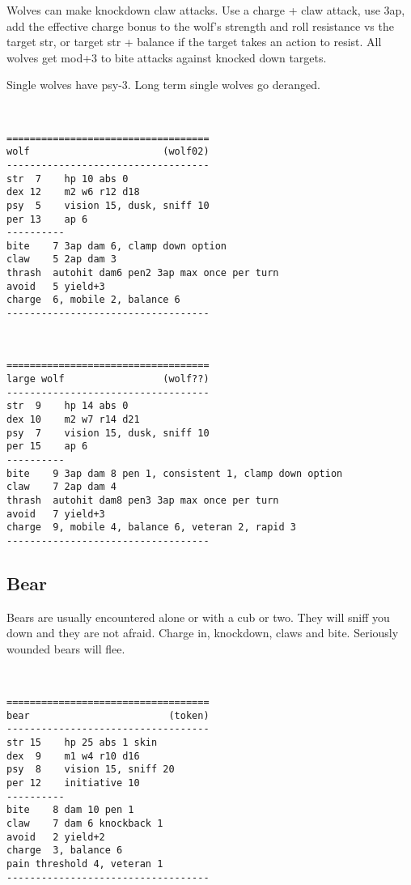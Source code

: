 Wolves can make knockdown claw attacks. Use a charge + claw attack, use 3ap, add the effective charge bonus to the wolf's strength and roll resistance vs the target str, or target str + balance if the target takes an action to resist.
All wolves get mod+3 to bite attacks against knocked down targets.

Single wolves have psy-3. Long term single wolves go deranged.

\

\small \begin{verbatim}
===================================
wolf                       (wolf02)
-----------------------------------
str  7    hp 10 abs 0
dex 12    m2 w6 r12 d18
psy  5    vision 15, dusk, sniff 10
per 13    ap 6
----------
bite    7 3ap dam 6, clamp down option
claw    5 2ap dam 3
thrash  autohit dam6 pen2 3ap max once per turn
avoid   5 yield+3
charge  6, mobile 2, balance 6
-----------------------------------
\end{verbatim} \normalsize

\

\begin{samepage} \small \begin{verbatim}
===================================
large wolf                 (wolf??)
-----------------------------------
str  9    hp 14 abs 0
dex 10    m2 w7 r14 d21
psy  7    vision 15, dusk, sniff 10
per 15    ap 6
----------
bite    9 3ap dam 8 pen 1, consistent 1, clamp down option
claw    7 2ap dam 4
thrash  autohit dam8 pen3 3ap max once per turn
avoid   7 yield+3
charge  9, mobile 4, balance 6, veteran 2, rapid 3
-----------------------------------
\end{verbatim} \normalsize \end{samepage}



\goodbreak \begin{samepage}
\subsection*{Bear}
Bears are usually encountered alone or with a cub or two. They will sniff you down and they are not afraid. Charge in, knockdown, claws and bite. Seriously wounded bears will flee.

\

\small \begin{verbatim}
===================================
bear                        (token)
-----------------------------------
str 15    hp 25 abs 1 skin
dex  9    m1 w4 r10 d16
psy  8    vision 15, sniff 20
per 12    initiative 10
----------
bite    8 dam 10 pen 1
claw    7 dam 6 knockback 1
avoid   2 yield+2
charge  3, balance 6
pain threshold 4, veteran 1
-----------------------------------
\end{verbatim} \normalsize \end{samepage}

